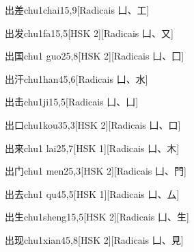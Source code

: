 \begin{entry}{出差}{chu1chai1}{5,9}[Radicais ⼐、⼯]
\end{entry}

\begin{entry}{出发}{chu1fa1}{5,5}[HSK 2][Radicais ⼐、⼜]
\end{entry}

\begin{entry}{出国}{chu1 guo2}{5,8}[HSK 2][Radicais ⼐、⼞]
\end{entry}

\begin{entry}{出汗}{chu1han4}{5,6}[Radicais ⼐、⽔]
\end{entry}

\begin{entry}{出击}{chu1ji1}{5,5}[Radicais ⼐、⼐]
\end{entry}

\begin{entry}{出口}{chu1kou3}{5,3}[HSK 2][Radicais ⼐、⼝]
\end{entry}

\begin{entry}{出来}{chu1 lai2}{5,7}[HSK 1][Radicais ⼐、⽊]
\end{entry}

\begin{entry}{出门}{chu1 men2}{5,3}[HSK 2][Radicais ⼐、⾨]
\end{entry}

\begin{entry}{出去}{chu1 qu4}{5,5}[HSK 1][Radicais ⼐、⼛]
\end{entry}

\begin{entry}{出生}{chu1sheng1}{5,5}[HSK 2][Radicais ⼐、⽣]
\end{entry}

\begin{entry}{出现}{chu1xian4}{5,8}[HSK 2][Radicais ⼐、⾒]
\end{entry}

